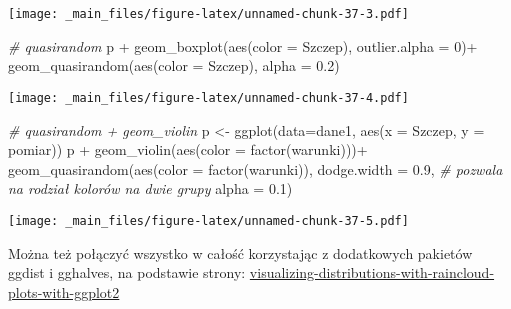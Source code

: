 \documentclass[
]{book}
\newenvironment{Shaded}{\begin{snugshade}}{\end{snugshade}}
\newcommand{\AttributeTok}[1]{\textcolor[rgb]{0.77,0.63,0.00}{#1}}
\newcommand{\CommentTok}[1]{\textcolor[rgb]{0.56,0.35,0.01}{\textit{#1}}}
\newcommand{\DecValTok}[1]{\textcolor[rgb]{0.00,0.00,0.81}{#1}}
\newcommand{\FloatTok}[1]{\textcolor[rgb]{0.00,0.00,0.81}{#1}}
\newcommand{\FunctionTok}[1]{\textcolor[rgb]{0.00,0.00,0.00}{#1}}
\newcommand{\NormalTok}[1]{#1}
\newcommand{\OtherTok}[1]{\textcolor[rgb]{0.56,0.35,0.01}{#1}}
\newcommand{\SpecialCharTok}[1]{\textcolor[rgb]{0.00,0.00,0.00}{#1}}
\begin{document}
\texttt{[image: \_main\_files/figure-latex/unnamed-chunk-37-3.pdf]}

\begin{Shaded}
\begin{Highlighting}[]
\CommentTok{\# quasirandom}
\NormalTok{p }\SpecialCharTok{+} \FunctionTok{geom\_boxplot}\NormalTok{(}\FunctionTok{aes}\NormalTok{(}\AttributeTok{color =}\NormalTok{ Szczep), }\AttributeTok{outlier.alpha =} \DecValTok{0}\NormalTok{)}\SpecialCharTok{+}
  \FunctionTok{geom\_quasirandom}\NormalTok{(}\FunctionTok{aes}\NormalTok{(}\AttributeTok{color =}\NormalTok{ Szczep), }\AttributeTok{alpha =} \FloatTok{0.2}\NormalTok{)}
\end{Highlighting}
\end{Shaded}

\texttt{[image: \_main\_files/figure-latex/unnamed-chunk-37-4.pdf]}

\begin{Shaded}
\begin{Highlighting}[]
\CommentTok{\# quasirandom + geom\_violin}
\NormalTok{p }\OtherTok{\textless{}{-}} \FunctionTok{ggplot}\NormalTok{(}\AttributeTok{data=}\NormalTok{dane1, }\FunctionTok{aes}\NormalTok{(}\AttributeTok{x =}\NormalTok{ Szczep, }\AttributeTok{y =}\NormalTok{ pomiar))}
\NormalTok{p }\SpecialCharTok{+} \FunctionTok{geom\_violin}\NormalTok{(}\FunctionTok{aes}\NormalTok{(}\AttributeTok{color =} \FunctionTok{factor}\NormalTok{(warunki)))}\SpecialCharTok{+}
  \FunctionTok{geom\_quasirandom}\NormalTok{(}\FunctionTok{aes}\NormalTok{(}\AttributeTok{color =} \FunctionTok{factor}\NormalTok{(warunki)), }
                   \AttributeTok{dodge.width =} \FloatTok{0.9}\NormalTok{, }\CommentTok{\# pozwala na rodział kolorów na dwie grupy}
                   \AttributeTok{alpha =} \FloatTok{0.1}\NormalTok{)}
\end{Highlighting}
\end{Shaded}

\texttt{[image: \_main\_files/figure-latex/unnamed-chunk-37-5.pdf]}

Można też połączyć wszystko w całość korzystając z dodatkowych pakietów ggdist i gghalves, na podstawie strony: \href{https://www.cedricscherer.com/2021/06/06/visualizing-distributions-with-raincloud-plots-with-ggplot2/}{visualizing-distributions-with-raincloud-plots-with-ggplot2}
\end{document}
